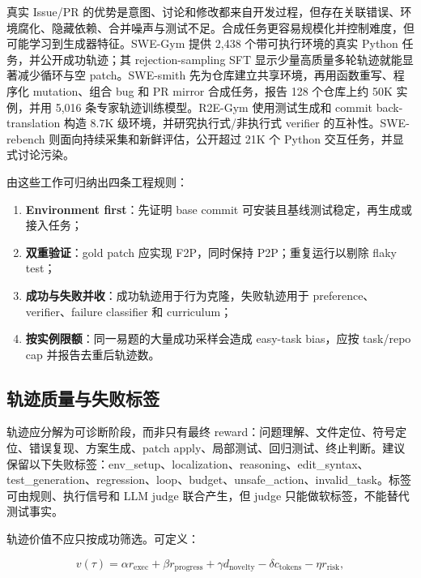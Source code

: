 \documentclass[10pt,a4paper,UTF8,fontset=none]{ctexart}
\newcommand{\ident}[1]{{\rmfamily #1}}
\begin{document}
真实 Issue/PR 的优势是意图、讨论和修改都来自开发过程，但存在关联错误、环境腐化、隐藏依赖、合并噪声与测试不足。合成任务更容易规模化并控制难度，但可能学习到生成器特征。SWE-Gym 提供 2,438 个带可执行环境的真实 Python 任务，并公开成功轨迹；其 rejection-sampling SFT 显示少量高质量多轮轨迹就能显著减少循环与空 patch\cite{zh:pan2024swegym}。SWE-smith 先为仓库建立共享环境，再用函数重写、程序化 mutation、组合 bug 和 PR mirror 合成任务，报告 128 个仓库上约 50K 实例，并用 5,016 条专家轨迹训练模型\cite{zh:yang2025swesmith}。R2E-Gym 使用测试生成和 commit back-translation 构造 8.7K 级环境，并研究执行式/非执行式 verifier 的互补性\cite{zh:jain2025r2egym}。SWE-rebench 则面向持续采集和新鲜评估，公开超过 21K 个 Python 交互任务，并显式讨论污染\cite{zh:badertdinov2025swerebench}。

由这些工作可归纳出四条工程规则：

\begin{enumerate}
  \item \textbf{Environment first}：先证明 base commit 可安装且基线测试稳定，再生成或接入任务；
  \item \textbf{双重验证}：gold patch 应实现 F2P，同时保持 P2P；重复运行以剔除 flaky test；
  \item \textbf{成功与失败并收}：成功轨迹用于行为克隆，失败轨迹用于 preference、verifier、failure classifier 和 curriculum；
  \item \textbf{按实例限额}：同一易题的大量成功采样会造成 easy-task bias，应按 task/repo cap 并报告去重后轨迹数。
\end{enumerate}

\subsection{轨迹质量与失败标签}

轨迹应分解为可诊断阶段，而非只有最终 reward：问题理解、文件定位、符号定位、错误复现、方案生成、patch apply、局部测试、回归测试、终止判断。建议保留以下失败标签：\ident{env\_setup}、\ident{localization}、\ident{reasoning}、\ident{edit\_syntax}、\ident{test\_generation}、\ident{regression}、\ident{loop}、\ident{budget}、\ident{unsafe\_action}、\ident{invalid\_task}。标签可由规则、执行信号和 LLM judge 联合产生，但 judge 只能做软标签，不能替代测试事实。

轨迹价值不应只按成功筛选。可定义：

\begin{equation}
v(\tau)=\alpha r_{\mathrm{exec}}+\beta r_{\mathrm{progress}}+\gamma d_{\mathrm{novelty}}-\delta c_{\mathrm{tokens}}-\eta r_{\mathrm{risk}},
\label{zh:eq:trajectory-value}
\end{equation}
\end{document}
